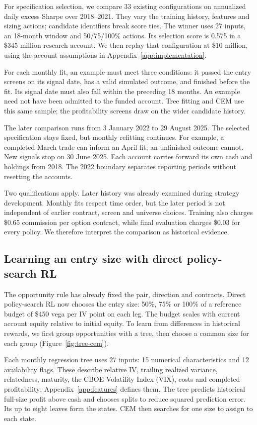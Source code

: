 \documentclass[11pt,letterpaper]{article}
\newcommand{\money}[1]{\$#1}
\begin{document}
For specification selection, we compare 33 existing configurations on
annualized daily excess Sharpe over 2018--2021. They vary the training history,
features and sizing actions; candidate identifiers break score ties. The
winner uses 27 inputs, an 18-month window and 50/75/100\% actions. Its selection
score is 0.575 in a \money{345 million} research account. We then replay that
configuration at \money{10 million}, using the account assumptions in
Appendix~\ref{app:implementation}.

For each monthly fit, an example must meet three conditions: it passed the
entry screens on its signal date, has a valid simulated outcome, and finished
before the fit. Its signal date must also fall within the preceding 18 months.
An example need not have been admitted to the funded account. Tree fitting
and CEM use this same sample; the profitability screens draw on the wider
candidate history.

The later comparison runs from 3 January 2022 to 29 August 2025. The selected
specification stays fixed, but monthly refitting continues. For example, a
completed March trade can inform an April fit; an unfinished outcome cannot.
New signals stop on 30 June 2025. Each account carries forward its own cash
and holdings from 2018. The 2022 boundary separates reporting periods without
resetting the accounts.

Two qualifications apply. Later history was already examined during strategy
development. Monthly fits respect time order, but the later period is not
independent of earlier contract, screen and universe choices. Training also
charges \money{0.65} commission per option contract, while final evaluation
charges \money{0.03} for every policy. We therefore interpret the comparison
as historical evidence.

\clearpage
\subsection{Learning an entry size with direct policy-search RL}
The opportunity rule has already fixed the pair, direction and contracts.
Direct policy-search RL now chooses the entry size: 50\%, 75\% or 100\% of a
reference budget of \money{450} vega per IV point on each leg. The budget
scales with current account equity relative to initial equity. To learn from
differences in historical rewards, we first group opportunities with a tree,
then choose a common size for each group (Figure~\ref{fig:tree-cem}).

Each monthly regression tree uses 27 inputs: 15 numerical characteristics and
12 availability flags. These describe relative IV, trailing realized variance,
relatedness, maturity, the CBOE Volatility Index (VIX), costs and completed
profitability; Appendix~\ref{app:features} defines them. The tree predicts
historical full-size profit above cash and chooses splits to reduce squared
prediction error. Its up to eight leaves form the states. CEM then searches
for one size to assign to each state.
\end{document}

